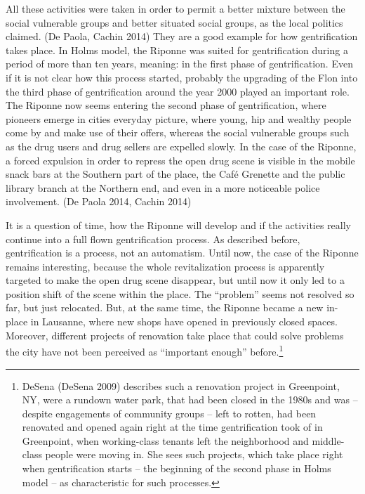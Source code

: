 \documentclass[a4paper,
fontsize=11pt,
oneside,
numbers=noperiodatend,
parskip=half-,
bibliography=totoc,
final
]{scrartcl}
\begin{document}
All these activities were taken in order to permit a better mixture
between the social vulnerable groups and better situated social groups,
as the local politics claimed. (De Paola, Cachin 2014) They are a good
example for how gentrification takes place. In Holms model, the Riponne
was suited for gentrification during a period of more than ten years,
meaning: in the first phase of gentrification. Even if it is not clear
how this process started, probably the upgrading of the Flon into the
third phase of gentrification around the year 2000 played an important
role. The Riponne now seems entering the second phase of gentrification,
where pioneers emerge in cities everyday picture, where young, hip and
wealthy people come by and make use of their offers, whereas the social
vulnerable groups such as the drug users and drug sellers are expelled
slowly. In the case of the Riponne, a forced expulsion in order to
repress the open drug scene is visible in the mobile snack bars at the
Southern part of the place, the Café Grenette and the public library
branch at the Northern end, and even in a more noticeable police
involvement. (De Paola 2014, Cachin 2014)

It is a question of time, how the Riponne will develop and if the
activities really continue into a full flown gentrification process. As
described before, gentrification is a process, not an automatism. Until
now, the case of the Riponne remains interesting, because the whole
revitalization process is apparently targeted to make the open drug
scene disappear, but until now it only led to a position shift of the
scene within the place. The \enquote{problem} seems not resolved so far,
but just relocated. But, at the same time, the Riponne became a new
in-place in Lausanne, where new shops have opened in previously closed
spaces. Moreover, different projects of renovation take place that could
solve problems the city have not been perceived as \enquote{important
enough} before.\footnote{DeSena (DeSena 2009) describes such a
  renovation project in Greenpoint, NY, were a rundown water park, that
  had been closed in the 1980s and was -- despite engagements of
  community groups -- left to rotten, had been renovated and opened
  again right at the time gentrification took of in Greenpoint, when
  working-class tenants left the neighborhood and middle-class people
  were moving in. She sees such projects, which take place right when
  gentrification starts -- the beginning of the second phase in Holms
  model -- as characteristic for such processes.}
\end{document}
